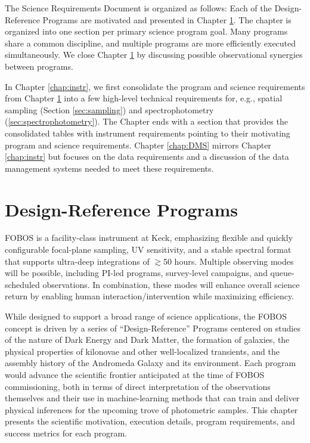 \documentclass[11pt,a4paper,twoside,onecolumn,openany,final,oldfontcommands]{memoir}
\begin{document}
The Science Requirements Document is organized as follows:  Each of the Design-Reference Programs are motivated and presented in Chapter \ref{chap:key}.  The chapter is organized into one section per primary science program goal.  Many programs share a common discipline, and multiple programs are more efficiently executed simultaneously.  We close Chapter \ref{chap:key} by discussing possible observational synergies between programs. 


In Chapter \ref{chap:instr}, we first consolidate the program and science requirements from Chapter \ref{chap:key} into a few high-level technical requirements for, e.g., spatial sampling (Section \ref{sec:sampling}) and spectrophotometry (\ref{sec:spectrophotometry}). The Chapter ends with a section that provides the consolidated tables with instrument requirements pointing to their motivating program and science requirements. Chapter \ref{chap:DMS} mirrors Chapter \ref{chap:instr} but focuses on the data requirements and a discussion of the data management systems needed to meet these requirements.



\chapter{Design-Reference Programs}
\label{chap:key}


FOBOS is a facility-class instrument at Keck, emphasizing flexible and quickly configurable focal-plane sampling, UV sensitivity, and a stable spectral format that supports ultra-deep integrations of $\gtrsim$50 hours.  Multiple observing modes will be possible, including PI-led programs, survey-level campaigns, and queue-scheduled observations.  In combination, these modes will enhance overall science return by enabling human interaction/intervention while maximizing efficiency.  

While designed to support a broad range of science applications, the FOBOS concept is driven by a series of ``Design-Reference'' Programs centered on studies of the nature of Dark Energy and Dark Matter, the formation of galaxies, the physical properties of kilonovae and other well-localized transients, and the assembly history of the Andromeda Galaxy and its environment.  Each program would advance the scientific frontier anticipated at the time of FOBOS commissioning, both in terms of direct interpretation of the observations themselves and their use in machine-learning methods that can train and deliver physical inferences for the upcoming trove of photometric samples.  This chapter presents the scientific motivation, execution details, program requirements, and success metrics for each program.
\end{document}
